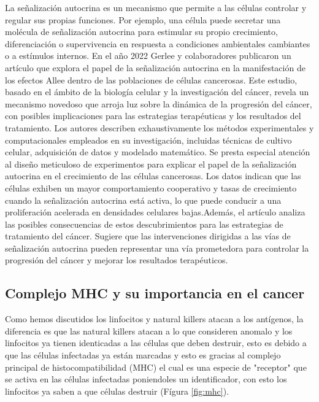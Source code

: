 \documentclass{article}
\begin{document}
La señalización autocrina es un mecanismo que permite a las células controlar y regular sus propias funciones. Por ejemplo, una célula puede secretar una molécula de señalización autocrina para estimular su propio crecimiento, diferenciación o supervivencia en respuesta a condiciones ambientales cambiantes o a estímulos internos. En el año 2022 Gerlee y colaboradores 
publicaron un artículo \cite{Gerlee032022} que  explora el papel de la señalización autocrina en la manifestación de los efectos Allee dentro de las poblaciones de células cancerosas. Este estudio, basado en el ámbito de la biología celular y la investigación del cáncer, revela un mecanismo novedoso que arroja luz sobre la dinámica de la progresión del cáncer, con posibles implicaciones para las estrategias terapéuticas y los resultados del tratamiento. Los autores describen exhaustivamente los métodos experimentales y computacionales empleados en su investigación, incluidas técnicas de cultivo celular, adquisición de datos y modelado matemático. Se presta especial atención al diseño meticuloso de experimentos para explicar el papel de la señalización autocrina en el crecimiento de las células cancerosas. Los datos indican que las células exhiben un mayor comportamiento cooperativo y tasas de crecimiento cuando la señalización autocrina está activa, lo que puede conducir a una proliferación acelerada en densidades celulares bajas.Además, el artículo analiza las posibles consecuencias de estos descubrimientos para las estrategias de tratamiento del cáncer. Sugiere que las intervenciones dirigidas a las vías de señalización autocrina pueden representar una vía prometedora para controlar la progresión del cáncer y mejorar los resultados terapéuticos.




\subsection{Complejo MHC y su importancia en el cancer}
Como hemos discutidos los linfocitos y natural killers atacan a los antígenos, la diferencia es que las natural killers atacan a lo que consideren anomalo y los  linfocitos ya tienen identicadas a las células que deben destruir, esto es debido a que las células infectadas ya están marcadas y esto es gracias al complejo principal de histocompatibilidad (MHC) el cual es una especie de "receptor" que se activa en las células infectadas poniendoles un identificador, con esto los linfocitos ya saben a que células destruir (Fígura \ref{fig:mhc}).
\end{document}
